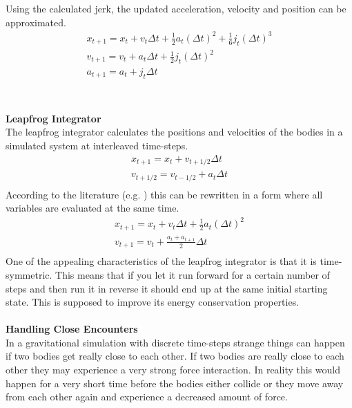 \documentclass[11pt]{article} %
\begin{document}
Using the calculated jerk, the updated acceleration, velocity and position can be approximated.
\begin{equation}
    \begin{split}
        x_{t+ 1} = x_t + v_t \Delta t + \frac{1}{2} a_t (\Delta t)^2 + \frac{1}{6} j_t (\Delta t)^3 \\
        v_{t+ 1} = v_t + a_t \Delta t + \frac{1}{2} j_t (\Delta t)^2 \\
        a_{t+ 1} = a_t + j_t \Delta t \\
    \end{split}
\end{equation}
\\\\
\textbf{Leapfrog Integrator}\\
The leapfrog integrator calculates the positions and velocities of the bodies in a simulated system at interleaved time-steps. 
\begin{equation}
    \begin{split}
        x_{t+ 1} = x_t + v_{t+1/2} \Delta t \\
        v_{t+ 1/2} = v_{t-1/2} + a_t \Delta t \\
    \end{split}
\end{equation}
According to the literature (e.g. \cite{1995ApJ...443L..93H}) this can be rewritten in a form where all variables are evaluated at the same time.
\begin{equation}
    \begin{split}
        x_{t+ 1} = x_t + v_t \Delta t  + \frac{1}{2} a_t (\Delta t)^2\\
        v_{t+ 1} = v_t + \frac{a_t + a_{t+1}}{2} \Delta t \\
    \end{split}
\end{equation}
One of the appealing characteristics of the leapfrog integrator is that it is time-symmetric. This means that if you let it run forward for a certain number of steps and then run it in reverse it should end up at the same initial starting state. This is supposed to improve its energy conservation properties.
\\\\
\textbf{Handling Close Encounters }\\
In a gravitational simulation with discrete time-steps strange things can happen if two bodies get really close to each other. If two bodies are really close to each other they may experience a very strong force interaction. In reality this would happen for a very short time before the bodies either collide or they move away from each other again and experience a decreased amount of force.\\
\end{document}
